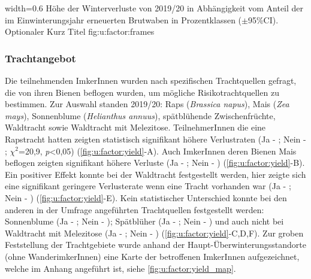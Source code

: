 {width=0.6\textwidth} %
{Höhe der Winterverluste von 2019/20 in Abhängigkeit vom Anteil der im Einwinterungsjahr erneuerten Brutwaben in Prozentklassen ($\pm $95\%CI).} %
{Optionaler Kurz Titel} %
{fig:u:factor:frames} %

\subsubsection{Trachtangebot}
\label{ss:trachtangebot:U}

Die teilnehmenden ImkerInnen wurden nach spezifischen Trachtquellen gefragt, die von ihren Bienen beflogen wurden, um mögliche Risikotrachtquellen zu bestimmen. Zur Auswahl standen 2019/20: Raps (\textit{Brassica napus}), Mais (\textit{Zea mays}), Sonnenblume (\textit{Helianthus annuus}), spätblühende Zwischenfrüchte, Waldtracht sowie Waldtracht mit Melezitose.
\newline
TeilnehmerInnen die eine Rapstracht hatten zeigten statistisch signifikant höhere Verlustraten (Ja - ; Nein - ; $\chi^{2}$=20,9, \textit{p}<0,05) (\cref{fig:u:factor:yield}-A). Auch ImkerInnen deren Bienen Mais beflogen zeigten signifikant höhere Verluste (Ja - ; Nein - ) (\cref{fig:u:factor:yield}-B).
\newline
Ein positiver Effekt konnte bei der Waldtracht festgestellt werden, hier zeigte sich eine signifikant geringere Verlusterate wenn eine Tracht vorhanden war (Ja - ; Nein - ) (\cref{fig:u:factor:yield}-E).
\newline
Kein statistischer Unterschied konnte bei den anderen in der Umfrage angeführten Trachtquellen festgestellt werden: Sonnenblume (Ja - ; Nein - ); Spätblüher (Ja - ; Nein - ) und auch nicht bei Waldtracht mit Melezitose (Ja - ; Nein - ) (\cref{fig:u:factor:yield}-C,D,F).
\newline
Zur groben Feststellung der Trachtgebiete wurde anhand der Haupt-Überwinterungsstandorte (ohne WanderimkerInnen) eine Karte der betroffenen ImkerInnen aufgezeichnet, welche im Anhang angeführt ist, siehe \cref{fig:u:factor:yield_map}.

